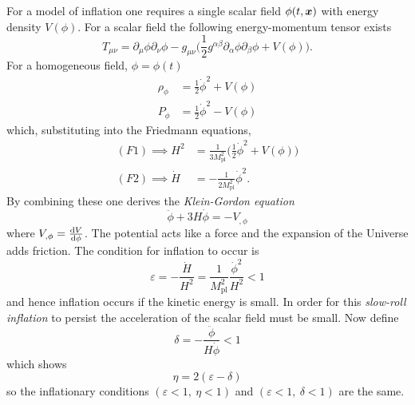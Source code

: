 For a model of inflation one requires a single scalar field \(\phi(t,\vb*{x})\) with energy density \(V(\phi)\).
For a scalar field the following energy-momentum tensor exists
%
\begin{equation}
	T_{\mu\nu}
	= \partial_{\mu}\phi \partial_{\nu}\phi
	- g_{\mu\nu}\bigg( \frac{1}{2}g^{\alpha\beta} \partial_{\alpha}\phi \partial_{\beta}\phi + V(\phi) \bigg).
\end{equation}
%
For a homogeneous field, \ie{} \(\phi = \phi(t)\)
%
\begin{subequations}
	\begin{align}
		\rho_{\phi} & = \frac{1}{2}\dot{\phi}^{2} + V(\phi) \\
		P_{\phi}    & = \frac{1}{2}\dot{\phi}^{2} - V(\phi)
	\end{align}
\end{subequations}
%
which, substituting into the Friedmann equations,
%
\begin{subequations}
	\begin{align}
		(F1) \implies H^{2}   & = \frac{1}{3M_{\text{pl}}^{2}} \bigg(\frac{1}{2}\dot{\phi}^{2} + V(\phi) \bigg) \\
		(F2) \implies \dot{H} & = -\frac{1}{2M_{\text{pl}}^{2}} \dot{\phi}^{2}.
	\end{align}
\end{subequations}
%
By combining these one derives the \emph{Klein-Gordon equation}
%
\begin{equation}\label{eq:chapter2_KG}
	\ddot{\phi} + 3H\dot{\phi}
	= -V_{,\phi}
\end{equation}
%
where \(V_{,\phi} = \dv{V}{\phi}\).
The potential acts like a force and the expansion of the Universe adds friction.
The condition for inflation to occur is
%
\begin{equation}
	\varepsilon
	= -\frac{\dot{H}}{H^{2}}
	= \frac{1}{M_{\text{pl}}^{2}} \frac{\dot{\phi}^{2}}{H^{2}}
	< 1
\end{equation}
%
and hence inflation occurs if the kinetic energy is small.
In order for this \emph{slow-roll inflation} to persist the acceleration of the scalar field must be small.
Now define
%
\begin{equation}
	\delta
	= -\frac{\ddot{\phi}}{H\dot{\phi}}
	< 1
\end{equation}
%
which shows
%
\begin{equation}
	\eta
	= 2(\varepsilon - \delta)
\end{equation}
%
so the inflationary conditions \((\varepsilon<1,\ \eta<1)\) and \((\varepsilon<1,\ \delta<1)\) are the same.
